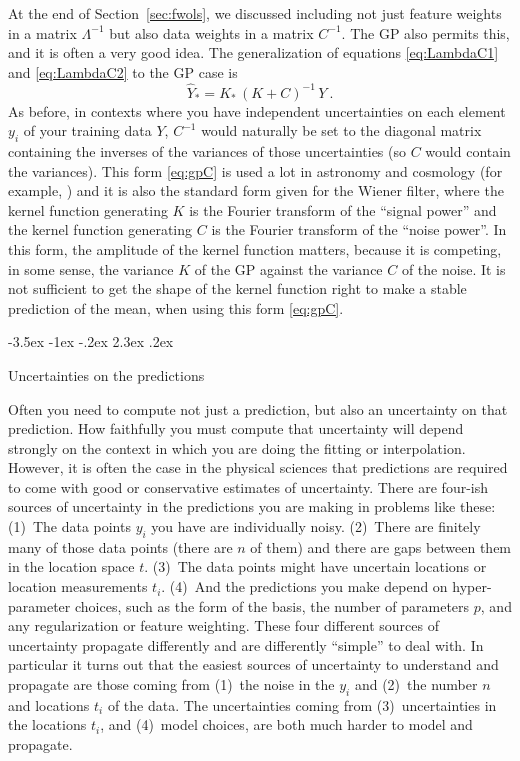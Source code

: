 \documentclass[12pt,letterpaper]{article}
\makeatletter
\renewcommand\section{\@startsection {section}{1}{\z@}%
  {-3.5ex \@plus -1ex \@minus -.2ex}%
  {2.3ex \@plus.2ex}%
  {\raggedright\normalfont\Large\bfseries}}
\newcommand{\sectionname}{Section}
\makeatother
\begin{document}
At the end of \sectionname~\ref{sec:fwols}, we discussed including not just feature weights in a matrix $\Lambda^{-1}$ but also data weights in a matrix $C^{-1}$. The GP also permits this, and it is often a very good idea. The generalization of equations \eqref{eq:LambdaC1} and \eqref{eq:LambdaC2} to the GP case is 
\begin{equation}\label{eq:gpC}
    \hat{Y}_\ast = K_\ast\,(K + C)^{-1}\,Y
    ~.
\end{equation}
As before, in contexts where you have independent uncertainties on each element $y_i$ of your training data $Y$, $C^{-1}$ would naturally be set to the diagonal matrix containing the inverses of the variances of those uncertainties (so $C$ would contain the variances).
This form \eqref{eq:gpC} is used a lot in astronomy and cosmology (for example, \citealt{zaroubi, aigrain, celerite}) and it is also the standard form given for the Wiener filter, where the kernel function generating $K$ is the Fourier transform of the ``signal power'' and the kernel function generating $C$ is the Fourier transform of the ``noise power''.
In this form, the amplitude of the kernel function matters, because it is competing, in some sense, the variance $K$ of the GP against the variance $C$ of the noise.
It is not sufficient to get the shape of the kernel function right to make a stable prediction of the mean, when using this form \eqref{eq:gpC}.

\section{Uncertainties on the predictions}\label{sec:uncertainty}

Often you need to compute not just a prediction, but also an uncertainty on that prediction.
How faithfully you must compute that uncertainty will depend strongly on the context in which you are doing the fitting or interpolation.
However, it is often the case in the physical sciences that predictions are required to come with good or conservative estimates of uncertainty.
There are four-ish sources of uncertainty in the predictions you are making in problems like these:
(1)~The data points $y_i$ you have are individually noisy.
(2)~There are finitely many of those data points (there are $n$ of them) and there are gaps between them in the location space $t$.
(3)~The data points might have uncertain locations or location measurements $t_i$.
(4)~And the predictions you make depend on hyper-parameter choices, such as the form of the basis, the number of parameters $p$, and any regularization or feature weighting.
These four different sources of uncertainty propagate differently and are differently ``simple'' to deal with.
In particular it turns out that the easiest sources of uncertainty to understand and propagate are those coming from (1)~the noise in the $y_i$ and (2)~the number $n$ and locations $t_i$ of the data.
The uncertainties coming from (3)~uncertainties in the locations $t_i$, and (4)~model choices, are both much harder to model and propagate.
\end{document}
